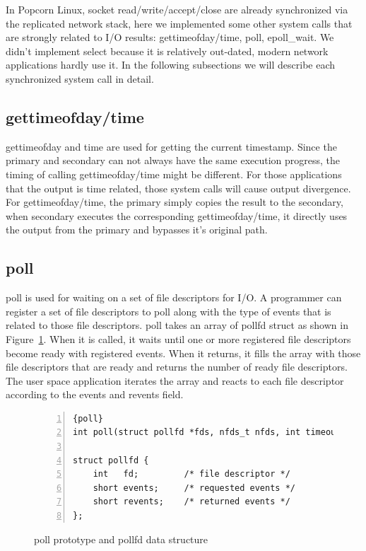 In Popcorn Linux, socket read/write/accept/close are already synchronized via the replicated network stack, here we implemented some other system calls that are strongly related to I/O results: gettimeofday/time, poll, epoll\_wait. We didn't implement select because it is relatively out-dated, modern network applications hardly use it. In the following subsections we will describe each synchronized system call in detail.

\subsection{gettimeofday/time}

gettimeofday and time are used for getting the current timestamp. Since the primary and secondary can not always have the same execution progress, the timing of calling gettimeofday/time might be different. For those applications that the output is time related, those system calls will cause output divergence. For gettimeofday/time, the primary simply copies the result to the secondary, when secondary executes the corresponding gettimeofday/time, it directly uses the output from the primary and bypasses it's original path.

\subsection{poll}

poll is used for waiting on a set of file descriptors for I/O. A programmer can register a set of file descriptors to poll along with the type of events that is related to those file descriptors. poll takes an array of pollfd struct as shown in Figure~\ref{f:pollfd}. When it is called, it waits until one or more registered file descriptors become ready with registered events. When it returns, it fills the array with those file descriptors that are ready and returns the number of ready file descriptors. The user space application iterates the array and reacts to each file descriptor according to the events and revents field.

\begin{figure}
\begin{lstlisting}[numbers=left, frame=single, basicstyle=\small, breaklines]{poll}
int poll(struct pollfd *fds, nfds_t nfds, int timeout);

struct pollfd {
    int   fd;         /* file descriptor */
    short events;     /* requested events */
    short revents;    /* returned events */
};
\end{lstlisting}
\caption{poll prototype and pollfd data structure}
\label{f:pollfd}
\end{figure}

